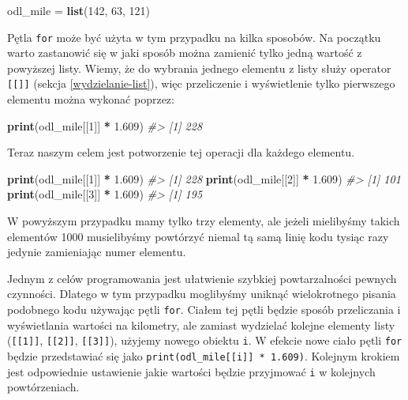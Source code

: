 \documentclass[paper=6in:9in,pagesize=pdftex,headinclude=on,footinclude=on,10pt]{scrbook}
\newenvironment{Shaded}{\begin{snugshade}}{\end{snugshade}}
\newcommand{\CommentTok}[1]{\textcolor[rgb]{0.56,0.35,0.01}{\textit{#1}}}
\newcommand{\DecValTok}[1]{\textcolor[rgb]{0.00,0.00,0.81}{#1}}
\newcommand{\FloatTok}[1]{\textcolor[rgb]{0.00,0.00,0.81}{#1}}
\newcommand{\KeywordTok}[1]{\textcolor[rgb]{0.13,0.29,0.53}{\textbf{#1}}}
\newcommand{\NormalTok}[1]{#1}
\newcommand{\OperatorTok}[1]{\textcolor[rgb]{0.81,0.36,0.00}{\textbf{#1}}}
\newcommand{\StringTok}[1]{\textcolor[rgb]{0.31,0.60,0.02}{#1}}
\begin{document}
\begin{Shaded}
\begin{Highlighting}[]
\NormalTok{odl_mile =}\StringTok{ }\KeywordTok{list}\NormalTok{(}\DecValTok{142}\NormalTok{, }\DecValTok{63}\NormalTok{, }\DecValTok{121}\NormalTok{)}
\end{Highlighting}
\end{Shaded}

Pętla \texttt{for} może być użyta w tym przypadku na kilka sposobów.
Na początku warto zastanowić się w jaki sposób można zamienić tylko jedną wartość z powyższej listy.
Wiemy, że do wybrania jednego elementu z listy służy operator \texttt{{[}{[}{]}{]}} (sekcja \ref{wydzielanie-list}), więc przeliczenie i wyświetlenie tylko pierwszego elementu można wykonać poprzez:

\begin{Shaded}
\begin{Highlighting}[]
\KeywordTok{print}\NormalTok{(odl_mile[[}\DecValTok{1}\NormalTok{]] }\OperatorTok{*}\StringTok{ }\FloatTok{1.609}\NormalTok{)}
\CommentTok{#> [1] 228}
\end{Highlighting}
\end{Shaded}

Teraz naszym celem jest potworzenie tej operacji dla każdego elementu.

\begin{Shaded}
\begin{Highlighting}[]
\KeywordTok{print}\NormalTok{(odl_mile[[}\DecValTok{1}\NormalTok{]] }\OperatorTok{*}\StringTok{ }\FloatTok{1.609}\NormalTok{)}
\CommentTok{#> [1] 228}
\KeywordTok{print}\NormalTok{(odl_mile[[}\DecValTok{2}\NormalTok{]] }\OperatorTok{*}\StringTok{ }\FloatTok{1.609}\NormalTok{)}
\CommentTok{#> [1] 101}
\KeywordTok{print}\NormalTok{(odl_mile[[}\DecValTok{3}\NormalTok{]] }\OperatorTok{*}\StringTok{ }\FloatTok{1.609}\NormalTok{)}
\CommentTok{#> [1] 195}
\end{Highlighting}
\end{Shaded}

W powyższym przypadku mamy tylko trzy elementy, ale jeżeli mielibyśmy takich elementów 1000 musielibyśmy powtórzyć niemal tą samą linię kodu tysiąc razy jedynie zamieniając numer elementu.

Jednym z celów programowania jest ułatwienie szybkiej powtarzalności pewnych czynności.
Dlatego w tym przypadku moglibyśmy uniknąć wielokrotnego pisania podobnego kodu używając pętli \texttt{for}.
Ciałem tej pętli będzie sposób przeliczania i wyświetlania wartości na kilometry, ale zamiast wydzielać kolejne elementy listy (\texttt{{[}{[}1{]}{]}}, \texttt{{[}{[}2{]}{]}}, \texttt{{[}{[}3{]}{]}}), użyjemy nowego obiektu \texttt{i}.
W efekcie nowe ciało pętli \texttt{for} będzie przedstawiać się jako \texttt{print(odl\_mile{[}{[}i{]}{]}\ *\ 1.609)}.
Kolejnym krokiem jest odpowiednie ustawienie jakie wartości będzie przyjmować \texttt{i} w kolejnych powtórzeniach.
\end{document}
